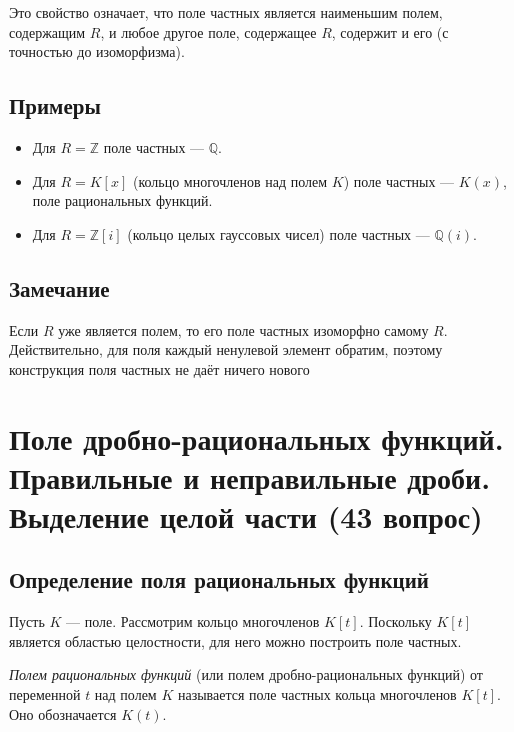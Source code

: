 \documentclass[a4paper,12pt]{article}
\theoremstyle{definition}
\theoremstyle{plain}
\theoremstyle{remark}
\begin{document}
	Это свойство означает, что поле частных является наименьшим полем, содержащим \( R \), и любое другое поле, содержащее \( R \), содержит и его (с точностью до изоморфизма).
	
	\subsection{Примеры}
	
	\begin{itemize}
		\item Для \( R = \mathbb{Z} \) поле частных — \( \mathbb{Q} \).
		\item Для \( R = K[x] \) (кольцо многочленов над полем \( K \)) поле частных — \( K(x) \), поле рациональных функций.
		\item Для \( R = \mathbb{Z}[i] \) (кольцо целых гауссовых чисел) поле частных — \( \mathbb{Q}(i) \).
	\end{itemize}
	
	\subsection{Замечание}
	
	Если \( R \) уже является полем, то его поле частных изоморфно самому \( R \). Действительно, для поля каждый ненулевой элемент обратим, поэтому конструкция поля частных не даёт ничего нового
	
	
	
	
	
	
	\newpage
	\section{Поле дробно-рациональных функций. Правильные и неправильные дроби. Выделение целой части (43 вопрос)}
	
	\subsection{Определение поля рациональных функций}
	
	Пусть \( K \) — поле. Рассмотрим кольцо многочленов \( K[t] \). Поскольку \( K[t] \) является областью целостности, для него можно построить поле частных.
	
	\begin{tcolorbox}[colback=blue!5, colframe=blue!40!black, title=Определение]
		\textit{Полем рациональных функций} (или полем дробно-рациональных функций) от переменной \( t \) над полем \( K \) называется поле частных кольца многочленов \( K[t] \). Оно обозначается \( K(t) \).
	\end{tcolorbox}
	
\end{document}
